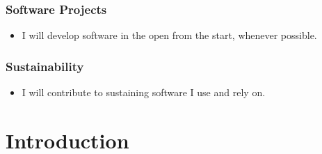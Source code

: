 \documentclass[a4paper,UKenglish]{dagman}
\renewcommand{\paragraph}[1]{\subsubsection*{#1}\xspace}
\begin{document}
\paragraph{Software Projects}
\begin{itemize}
\item I will develop software in the open from the start, whenever possible.


\end{itemize}

\paragraph{Sustainability}
\begin{itemize}
\item I will contribute to sustaining software I use and rely on. 

\end{itemize}



\tableofcontents

\section{Introduction}

\end{document}
